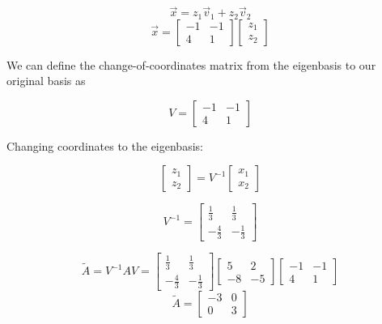 \begin{enumerate}
{\begin{centering}
\begin{tikzpicture}
	\end{tikzpicture}
\end{centering}

$$\vec x = z_1 \vec v_{1} + z_2 \vec v_{2}$$
$$\vec x =\begin{bmatrix} -1 & -1 \\ 4 & 1\end{bmatrix}\begin{bmatrix}z_{1} \\ z_{2}\end{bmatrix}$$

We can define the change-of-coordinates matrix from the eigenbasis to our original basis as

$$V=\begin{bmatrix} -1 & -1 \\ 4 & 1\end{bmatrix}$$

Changing coordinates to the eigenbasis:

$$\begin{bmatrix}z_{1} \\ z_{2}\end{bmatrix} = V^{-1}\begin{bmatrix} x_1 \\ x_2\end{bmatrix}   $$

$$V^{-1}=\begin{bmatrix}\frac{1}{3} & \frac{1}{3} \\ -\frac{4}{3} & -\frac{1}{3}\end{bmatrix}$$

$$\widetilde{A} = V^{-1} A V = \begin{bmatrix}\frac{1}{3} & \frac{1}{3} \\ -\frac{4}{3} & -\frac{1}{3}\end{bmatrix}\begin{bmatrix}5 & 2 \\ -8 & -5\end{bmatrix}\begin{bmatrix} -1 & -1 \\ 4 & 1\end{bmatrix}$$
$$\widetilde{A} = \begin{bmatrix}-3 & 0 \\ 0 & 3\end{bmatrix}$$

}
\end{enumerate}
